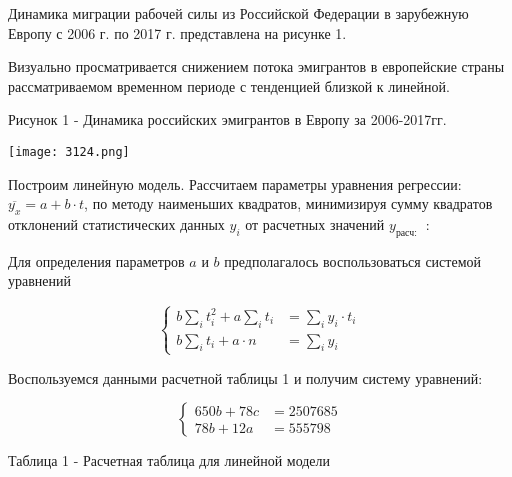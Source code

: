 \documentclass{article}
\begin{document}
Динамика миграции рабочей силы из Российской Федерации в зарубежную Европу с 2006 г. по 2017 г. представлена на рисунке 1.

Визуально просматривается снижением потока эмигрантов в европейские страны рассматриваемом временном периоде с тенденцией близкой к линейной.


Рисунок 1 - Динамика российских эмигрантов в Европу за 2006-2017гг.

\begin{center}
\texttt{[image: 3124.png]}
\end{center}

Построим линейную модель. Рассчитаем параметры уравнения регрессии: $\overline{y_{x}}=a+b \cdot t$, по методу наименьших квадратов, минимизируя сумму квадратов отклонений статистических данных $y_{i}$ от расчетных значений $y_{\text {расч: }}$ :

Для определения параметров $a$ и $b$ предполагалось воспользоваться системой уравнений

$$
\left\{\begin{aligned}
b \sum_{i} t_{i}^{2}+a \sum_{i} t_{i} & =\sum_{i} y_{i} \cdot t_{i} \\
b \sum_{i} t_{i}+a \cdot n & =\sum_{i} y_{i}
\end{aligned}\right.
$$

Воспользуемся данными расчетной таблицы 1 и получим систему уравнений:

$$
\left\{\begin{aligned}
650 b+78 c & =2507685 \\
78 b+12 a & =555798
\end{aligned}\right.
$$

Таблица 1 - Расчетная таблица для линейной модели
\end{document}
